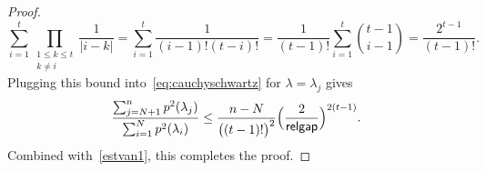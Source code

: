 \documentclass[10pt,a4paper]{amsart}
\newcommand{\gap}{\mathsf{relgap}}
\providecommand{\abs}[1]{\lvert#1\rvert}
\begin{document}
\begin{proof}
    \begin{equation*}
        \sum_{i=1}^{t}\prod_{\substack{1\leq k\leq t\\ k\neq i}}\frac{1}{\abs{i-k}}=\sum_{i=1}^{t}\frac{1}{(i-1)!(t-i)!}=\frac{1}{(t-1)!}\sum_{i=1}^{t} \binom{t-1}{i-1} =\frac{2^{t-1}}{(t-1)!}.
    \end{equation*}
    Plugging this bound into~\eqref{eq:cauchyschwartz} for $\lambda = \lambda_j$ gives
    \begin{equation*}
        \begin{aligned}
            \frac{\sum_{j=N+1}^{n}p^{2}(\lambda_{j})}{\sum_{i=1}^{N}p^{2}(\lambda_{i})}\leq \frac{n-N}{\bigl((t-1)!\bigr)^{2}}\Bigl(\frac{2}{\gap}\Bigr)^{2(t-1)}.
        \end{aligned}
    \end{equation*}
    Combined with~\cref{estvan1}, this completes the proof.
\end{proof}
\end{document}
